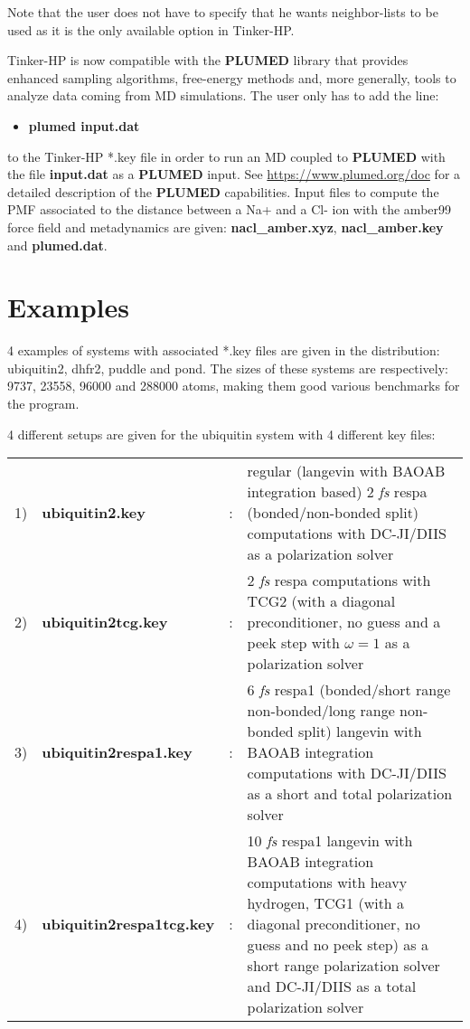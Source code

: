 \documentclass[peerreview]{IEEEtran}
\begin{document}
\vskip5mm
Note that the user does not have to specify that he wants neighbor-lists to be used as it is the only available option in Tinker-HP.

\vskip5mm
Tinker-HP is now compatible with the \textbf{PLUMED} library that provides enhanced sampling algorithms, free-energy methods and, more generally, tools to analyze data coming from MD simulations. The user only has to add the line: 
\begin{itemize}
\item[]\textbf{plumed input.dat}
\end{itemize}
to the Tinker-HP *.key file in order to run an MD coupled to \textbf{PLUMED} with the file \textbf{input.dat} as a \textbf{PLUMED} input. See \url{https://www.plumed.org/doc} for a detailed description of the \textbf{PLUMED} capabilities. Input files to compute the PMF associated to the distance between a Na+ and a Cl- ion with the amber99 force field and metadynamics are given: \textbf{nacl\_amber.xyz}, \textbf{nacl\_amber.key} and \textbf{plumed.dat}.
\section{Examples}
4 examples of systems with associated *.key files are given in the distribution: ubiquitin2, dhfr2, puddle and pond. The sizes of these systems are respectively: 9737, 23558, 96000 and 288000 atoms, making them good various benchmarks for the program. 

4 different setups are given for the ubiquitin system with 4 different key files:

\begin{tabular}{lllp{13.3cm}}
1)&\textbf{ubiquitin2.key}& : &regular (langevin with BAOAB integration based) 2 {\em fs} respa (bonded/non-bonded split) computations with DC-JI/DIIS as a polarization solver \\
2)&\textbf{ubiquitin2tcg.key}& : &2 {\em fs} respa computations with TCG2 (with a diagonal preconditioner, no guess and a peek step with $\omega=1$ as a polarization solver\\
3)&\textbf{ubiquitin2respa1.key}& : &6 {\em fs} respa1 (bonded/short range non-bonded/long range non-bonded split) langevin with BAOAB integration computations with DC-JI/DIIS as a short and total polarization solver\\
4)&\textbf{ubiquitin2respa1tcg.key}& : &10 {\em fs} respa1 langevin with BAOAB integration computations with heavy hydrogen, TCG1 (with a diagonal preconditioner, no guess and no peek step) as a short range polarization solver and DC-JI/DIIS as a total polarization solver\\
\end{tabular}
\end{document}
